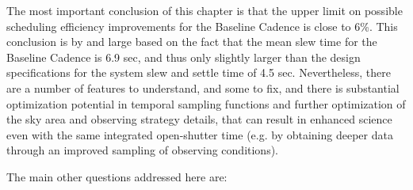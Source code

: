 The most important conclusion of this chapter is that the upper limit on
possible scheduling efficiency improvements for the Baseline Cadence is
close to 6\%. This conclusion is by and large based on the fact that
the mean slew time for the Baseline Cadence is 6.9 sec, and
thus only slightly larger than the design specifications for the
system slew and settle time of 4.5 sec.  Nevertheless, there are a
number of features to understand, and some to fix, and there is
substantial optimization potential in temporal sampling functions and
further optimization of the sky area and observing strategy details,
that can result in enhanced science even with the same integrated
open-shutter time (e.g. by obtaining deeper data through an improved
sampling of observing conditions).

\vskip 0.2in
The main other questions addressed here are:

